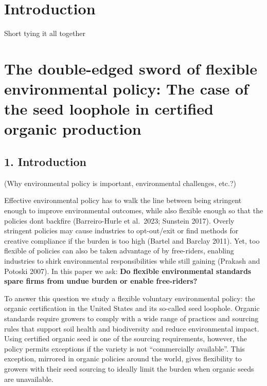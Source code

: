 \documentclass[twoside,12pt,final]{ucthesis-CA2012}
\begin{document}
\begin{ucmainmatter}

\hypertarget{introduction}{%
\chapter*{Introduction}\label{introduction}}

Short tying it all together

\hypertarget{the-double-edged-sword-of-flexible-environmental-policy-the-case-of-the-seed-loophole-in-certified-organic-production}{%
\chapter{The double-edged sword of flexible environmental policy: The case of the seed loophole in certified organic production}\label{the-double-edged-sword-of-flexible-environmental-policy-the-case-of-the-seed-loophole-in-certified-organic-production}}


\hypertarget{introduction-1}{%
\section{1. Introduction}\label{introduction-1}}

(Why environmental policy is important, environmental challenges, etc.?)

Effective environmental policy has to walk the line between being
stringent enough to improve environmental outcomes, while also flexible
enough so that the policies don\textquotesingle t backfire (Barreiro-Hurle et al.~2023;
Sunstein 2017). Overly stringent policies may cause industries to
opt-out/exit or find methods for creative compliance if the burden is
too high (Bartel and Barclay 2011). Yet, too flexible of policies can
also be taken advantage of by free-riders, enabling industries to shirk
environmental responsibilities while still gaining (Prakash and Potoski
2007). In this paper we ask: \textbf{Do flexible environmental standards spare
firms from undue burden or enable free-riders?}

To answer this question we study a flexible voluntary environmental
policy: the organic certification in the United States and its so-called
seed loophole. Organic standards require growers to comply with a wide
range of practices and sourcing rules that support soil health and
biodiversity and reduce environmental impact. Using certified organic
seed is one of the sourcing requirements, however, the policy permits
exceptions if the variety is not ``commercially available''. This
exception, mirrored in organic policies around the world, gives
flexibility to growers with their seed sourcing to ideally limit the
burden when organic seeds are unavailable.


\end{ucmainmatter}
\end{document}
